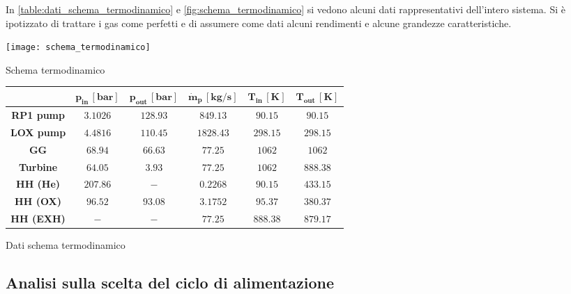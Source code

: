 In \autoref{table:dati_schema_termodinamico} e \autoref{fig:schema_termodinamico} si vedono alcuni dati rappresentativi dell'intero sistema. Si è ipotizzato di trattare i gas come perfetti e di assumere come dati alcuni rendimenti e alcune grandezze caratteristiche.

\begin{minipage}{0.4\linewidth}
    \centering
    \captionsetup{type=figure}
    \texttt{[image: schema\_termodinamico]}
    \caption{Schema termodinamico}
    \label{fig:schema_termodinamico}
\end{minipage}\hfill
\begin{minipage}{0.6\linewidth}
    \centering
    \captionsetup{type=table}
    \scriptsize
    \renewcommand{\arraystretch}{2}
    \setlength\extrarowheight{-1pt}
    \begin{tabular}{|c|c|c|c|c|c|}
        \hline
        & $\bm{p_{in} \, [bar]}$ & $\bm{p_{out} \, [bar]}$ & $\bm{\dot{m}_{p} \, [kg/s]}$ & $\bm{T_{in} \, [K]}$ & $\bm{T_{out} \, [K]}$ \\
        \hline
        \textbf{RP1 pump} & $3.1026$ & $128.93$ & $849.13$ & $90.15$ & $90.15$ \\
        \hline
        \textbf{LOX pump} & $4.4816$ & $110.45$ & $1828.43$ & $298.15$ & $298.15$ \\
        \hline
        \textbf{GG} & $68.94$ & $66.63$ & $77.25$ & $1062$ & $1062$ \\
        \hline
        \textbf{Turbine} & $64.05$ & $3.93$ & $77.25$ & $1062$ & $888.38$ \\
        \hline
        \textbf{HH (He)} & $207.86$ & $-$ & $0.2268$ & $90.15$ & $433.15$ \\
        \hline
        \textbf{HH (OX)} & $96.52$ & $93.08$ & $3.1752$ & $95.37$ & $380.37$ \\
        \hline
        \textbf{HH (EXH)} & $-$ & $-$ & $77.25$ & $888.38$ & $879.17$ \\
        \hline
    \end{tabular}
    \caption{Dati schema termodinamico}
    \label{table:dati_schema_termodinamico}
\end{minipage}

\subsection{Analisi sulla scelta del ciclo di alimentazione}
\label{subsec:analisi ciclo alimentazione}

